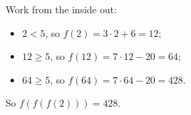 Work from the inside out:
\begin{itemize}
\item $2<5$, so $f(2)=3\cdot2+6=12$;
\item $12\ge5$, so $f(12)=7\cdot12-20=64$;
\item $64\ge5$, so $f(64)=7\cdot64-20=428$.
\end{itemize}
So $f(f(f(2)))=\boxed{428}$.

